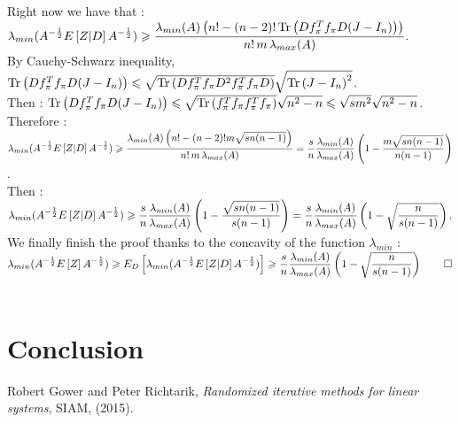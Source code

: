 \begin{itemize}
Right now we have that :\\

$\displaystyle \lambda_{min}(A^{-\frac12}E\left[Z|D\right]A^{-\frac12} ) \geqslant \displaystyle  \frac{\lambda_{min}(A) \left( n! - (n-2)! \operatorname{Tr}\left(D f_{\pi}^{T} f_{\pi} D (J-I_{n})\right)    \right)  }{ n! \,m\, \lambda_{max}(A) }. $\\

By Cauchy-Schwarz inequality, $ \operatorname{Tr}\left(D f_{\pi}^{T} f_{\pi} D (J-I_{n})\right) \leqslant  \sqrt{\operatorname{Tr}\left(D f_{\pi}^{T} f_{\pi} D^{2} f_{\pi}^{T} f_{\pi} D \right) }\sqrt{ \operatorname{Tr}\left(J-I_{n}\right)^{2}}$.\\
Then : $ \operatorname{Tr}\left(D f_{\pi}^{T} f_{\pi} D (J-I_{n})\right) \leqslant  \sqrt{\operatorname{Tr}\left( f_{\pi}^{T} f_{\pi} f_{\pi}^{T} f_{\pi} \right) } \sqrt{n^{2}-n}\leqslant \sqrt{s m^{2}}\sqrt{n^{2}-n} $.\\
Therefore :\\
$\displaystyle \lambda_{min}(A^{-\frac12}E\left[Z|D\right]A^{-\frac12} ) \geqslant  \frac{\lambda_{min}(A) \left( n! - (n-2)! m\sqrt{s n (n-1)}   \right)  }{ n! \,m\, \lambda_{max}(A) } =\frac{s}{n} \frac{\lambda_{min}(A)}{\lambda_{max}(A)}\left(1-\frac{m\sqrt{s n (n-1)}}{n(n-1)}\right) $.\\
Then :\\
$\displaystyle \lambda_{min}(A^{-\frac12}E\left[Z|D\right]A^{-\frac12} ) \geqslant \frac{s}{n} \frac{\lambda_{min}(A)}{\lambda_{max}(A)}\left(1-\frac{\sqrt{s n (n-1)}}{s(n-1)}\right) = \frac{s}{n} \frac{\lambda_{min}(A)}{\lambda_{max}(A)}\left(1-\sqrt{\frac{n}{s(n-1)}}\right).$\\

We finally finish the proof thanks to the concavity of the function $\lambda_{min}$ :\\
  $\displaystyle \lambda_{min}(A^{-\frac12}E\left[Z\right]A^{-\frac12} ) \geqslant E_{D}\left[\lambda_{min}(A^{-\frac12}E\left[Z|D\right]A^{-\frac12} )\right] \geqslant \frac{s}{n} \frac{\lambda_{min}(A)}{\lambda_{max}(A)}\left(1-\sqrt{\frac{n}{s(n-1)}}\right) \qed$\\\\

 




  \end{itemize}
 
 
\chapter{Conclusion}

\appendix
\begin{thebibliography}{1}

\bibitem{}
{\sc Robert Gower and Peter Richtarik}, {\em Randomized iterative methods for linear systems}, SIAM, 
  (2015).



\end{thebibliography}





